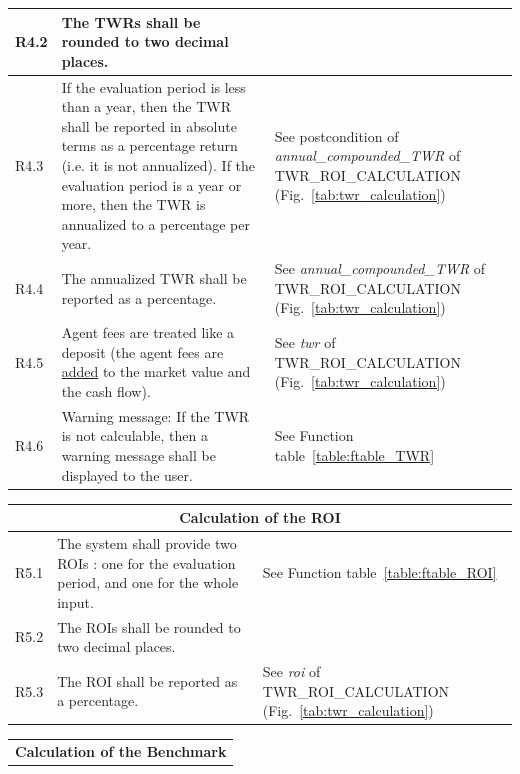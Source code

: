 \documentclass[runningheads,12pt]{article}
\begin{document}
{\begin{longtable}{|l|p{9cm}|p{5cm}|}
\hline
R4.2 &  The TWRs shall be rounded to two decimal places. & \\

\hline
R4.3 & If the evaluation period is less than a year, then the TWR shall be reported in absolute terms as a percentage return (i.e. it is not annualized). If the evaluation period is a year or more, then the TWR is annualized to a percentage per year. & See postcondition of  \textit{annual\_compounded\_TWR} of TWR\_ROI\_CALCULATION (Fig.~\ref{tab:twr_calculation})\\

\hline
R4.4 & The annualized TWR shall be reported as a percentage. & See \textit{annual\_compounded\_TWR} of TWR\_ROI\_CALCULATION (Fig.~\ref{tab:twr_calculation})\\

\hline
R4.5 & Agent fees are treated like a deposit (the agent fees are \underline{added} to the market value and the cash flow). & See \textit{twr} of TWR\_ROI\_CALCULATION (Fig.~\ref{tab:twr_calculation})\\

\hline
R4.6 & Warning message: If the TWR is not calculable, then a warning message shall be displayed to the user. & See Function table~\ref{table:ftable_TWR}\\

\hline
\end{longtable}
\centering
\begin{longtable}{|l|p{9cm}|p{5cm}|}

\hline
\multicolumn{3}{|c|}{\textbf{Calculation of the ROI}} \\

\hline
R5.1 & The system shall provide two ROIs : one for the evaluation period, and one for the whole input. & See Function table~\ref{table:ftable_ROI}\\

\hline
R5.2 &  The ROIs shall be rounded to two decimal places. & \\

\hline
R5.3 & The ROI shall be reported as a percentage. & See \textit{roi} of TWR\_ROI\_CALCULATION (Fig.~\ref{tab:twr_calculation})\\

\hline
\end{longtable}
\centering
\begin{longtable}{|l|p{9cm}|p{5cm}|}

\hline
\multicolumn{3}{|c|}{\textbf{Calculation of the Benchmark}} \\


\end{longtable}}
\end{document}
